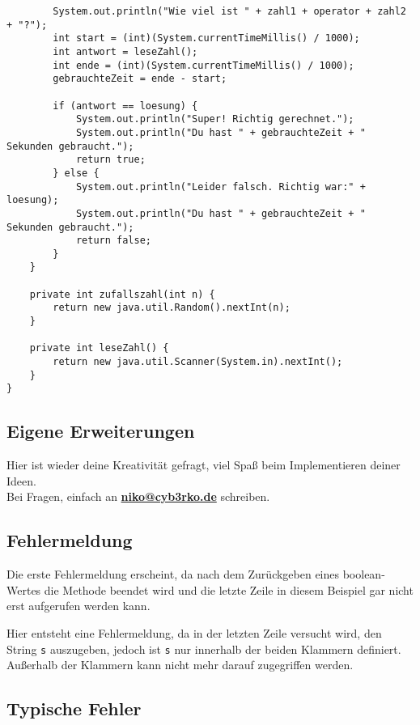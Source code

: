 \documentclass{scrartcl}   %
\begin{document}
\begin{lstlisting}
        System.out.println("Wie viel ist " + zahl1 + operator + zahl2 + "?");
        int start = (int)(System.currentTimeMillis() / 1000);
        int antwort = leseZahl();
        int ende = (int)(System.currentTimeMillis() / 1000);
        gebrauchteZeit = ende - start;
        
        if (antwort == loesung) {
            System.out.println("Super! Richtig gerechnet.");
            System.out.println("Du hast " + gebrauchteZeit + " Sekunden gebraucht.");
            return true;
        } else {
            System.out.println("Leider falsch. Richtig war:" + loesung);
            System.out.println("Du hast " + gebrauchteZeit + " Sekunden gebraucht.");
            return false;
        }
    }

    private int zufallszahl(int n) {
        return new java.util.Random().nextInt(n);
    }

    private int leseZahl() {
        return new java.util.Scanner(System.in).nextInt();
    }
}
\end{lstlisting}

\subsection{Eigene Erweiterungen}

Hier ist wieder deine Kreativität gefragt, viel Spaß beim Implementieren deiner Ideen.\\
Bei Fragen, einfach an \textbf{\href{mailto:niko@cyb3rko.de}{niko@cyb3rko.de}} schreiben.

\subsection{Fehlermeldung}

\begin{itemize}
    \barrow Die erste Fehlermeldung erscheint, da nach dem Zurückgeben eines boolean-Wertes die Methode beendet wird und die letzte Zeile in diesem Beispiel gar nicht erst aufgerufen werden kann.
    
    \newpage
    
    \barrow Hier entsteht eine Fehlermeldung, da in der letzten Zeile versucht wird, den String \texttt{s} auszugeben, jedoch ist \texttt{s} nur innerhalb der beiden Klammern definiert. Außerhalb der Klammern kann nicht mehr darauf zugegriffen werden.
\end{itemize}

\subsection{Typische Fehler}
\end{document}
